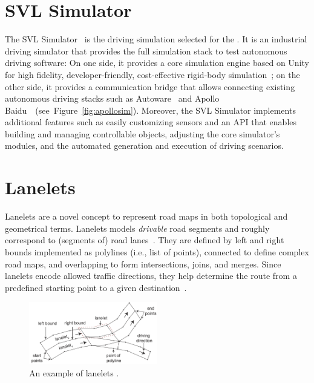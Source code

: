 \documentclass[conference]{IEEEtran}
\begin{document}
\section{SVL Simulator}
\label{subsect:lgsvl}
The SVL Simulator~\cite{rong2020lgsvl} is the driving simulation selected for the \challenge.
It is an industrial driving simulator that provides the full simulation stack to test autonomous driving software: On one side, it provides a core simulation engine based on Unity for high fidelity, developer-friendly, cost-effective rigid-body simulation~\cite{craighead2008using}; on the other side, it provides a communication bridge that allows connecting existing autonomous driving stacks such as Autoware~\cite{DBLP:journals/micro/KatoTINTH15} and Apollo Baidu~\cite{apollo}~(see~Figure~\ref{fig:apollosim}). 
Moreover, the SVL Simulator implements additional features such as easily customizing sensors and an API that enables building and managing controllable objects, adjusting the core simulator's modules, and the automated generation and execution of driving scenarios.


\section{Lanelets}
\label{subsect:lanelets}
Lanelets are a novel concept to represent road maps in both topological and geometrical terms. Lanelets models \emph{drivable} road segments and roughly correspond to (segments of) road lanes~\cite{bender2014lanelets}. They are defined by left and right bounds implemented as polylines (i.e., list of points), connected to define complex road maps, and overlapping to form intersections, joins, and merges. Since lanelets encode allowed traffic directions, they help determine the route from a predefined starting point to a given destination~\cite{PekIV20}.

\begin{figure}[tp]
  \centering
    \includegraphics[width=0.5\textwidth]{images/lanelets_01}
  \caption{An example of lanelets \cite{althoff2018automatic}.}
  \label{fig:lanelets}
\end{figure}
\end{document}
